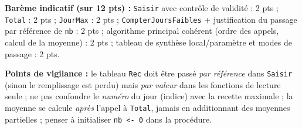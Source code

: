 \documentclass[11pt]{article}
\begin{document}
\begin{corrige}
\medskip
\textbf{Barème indicatif (sur 12 pts) :} \texttt{Saisir} avec contrôle de validité : 2 pts ; \texttt{Total} : 2 pts ; \texttt{JourMax} : 2 pts ; \texttt{CompterJoursFaibles} + justification du passage par référence de \texttt{nb} : 2 pts ; algorithme principal cohérent (ordre des appels, calcul de la moyenne) : 2 pts ; tableau de synthèse local/paramètre et modes de passage : 2 pts.

\textbf{Points de vigilance :} le tableau \texttt{Rec} doit être passé \emph{par référence} dans \texttt{Saisir} (sinon le remplissage est perdu) mais \emph{par valeur} dans les fonctions de lecture seule ; ne pas confondre le \emph{numéro} du jour (indice) avec la recette maximale ; la moyenne se calcule \emph{après} l'appel à \texttt{Total}, jamais en additionnant des moyennes partielles ; penser à initialiser \texttt{nb <- 0} dans la procédure.
\end{corrige}
\end{document}
